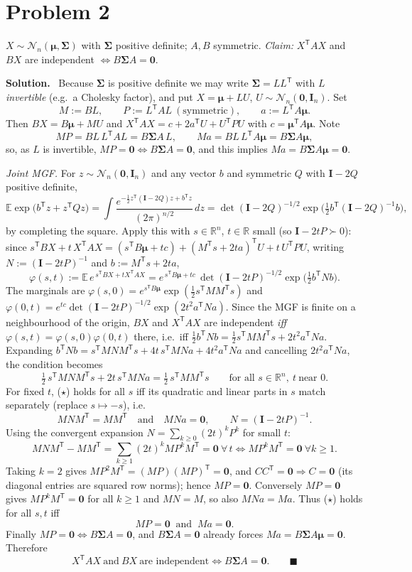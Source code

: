 \documentclass[11pt]{article}
\newcommand{\E}{\mathbb{E}}
\newcommand{\R}{\mathbb{R}}
\newcommand{\N}{\mathcal{N}}
\newcommand{\bI}{\mathbf{I}}
\newcommand{\bmu}{\bm{\mu}}
\newcommand{\bSig}{\bm{\Sigma}}
\newcommand{\T}{^{\mathsf{T}}}
\newcommand{\inv}{^{-1}}
\theoremstyle{remark}
\newcommand{\ans}{\medskip\noindent\textbf{Solution.}\ }
\begin{document}
\section*{Problem 2}

$X\sim\N_n(\bmu,\bSig)$ with $\bSig$ positive definite; $A,B$ symmetric. \emph{Claim:} $X\T AX$ and $BX$
are independent $\iff B\bSig A=\mathbf 0$.

\ans
Because $\bSig$ is positive definite we may write $\bSig=LL\T$ with $L$ \emph{invertible} (e.g.\ a Cholesky
factor), and put $X=\bmu+LU$, $U\sim\N_n(\mathbf 0,\bI_n)$. Set
\[
M:=BL,\qquad P:=L\T AL\ (\text{symmetric}),\qquad a:=L\T A\bmu .
\]
Then $BX=B\bmu+MU$ and $X\T AX=c+2a\T U+U\T PU$ with $c=\bmu\T A\bmu$. Note
\[
MP=BL\,L\T AL=B\bSig A\,L,\qquad Ma=BL\,L\T A\bmu=B\bSig A\bmu,
\]
so, as $L$ is invertible, $MP=\mathbf 0\iff B\bSig A=\mathbf 0$, and this implies $Ma=B\bSig A\bmu=\mathbf 0$.

\medskip
\emph{Joint MGF.} For $z\sim\N_n(\mathbf 0,\bI_n)$ and any vector $b$ and symmetric $Q$ with $\bI-2Q$
positive definite,
\[
\E\exp\!\big(b\T z+z\T Qz\big)
=\int\frac{e^{-\frac12 z\T(\bI-2Q)z+b\T z}}{(2\pi)^{n/2}}\,dz
=\det(\bI-2Q)^{-1/2}\exp\!\Big(\tfrac12 b\T(\bI-2Q)\inv b\Big),
\]
by completing the square. Apply this with $s\in\R^n$, $t\in\R$ small (so $\bI-2tP\succ0$): since
$s\T BX+t\,X\T AX=(s\T B\bmu+tc)+(M\T s+2ta)\T U+t\,U\T PU$, writing $N:=(\bI-2tP)\inv$ and $b:=M\T s+2ta$,
\[
\varphi(s,t):=\E\,e^{\,s\T BX+t X\T AX}
=e^{\,s\T B\bmu+tc}\,\det(\bI-2tP)^{-1/2}\exp\!\big(\tfrac12 b\T N b\big).
\]
The marginals are $\varphi(s,0)=e^{s\T B\bmu}\exp(\tfrac12 s\T MM\T s)$ and
$\varphi(0,t)=e^{tc}\det(\bI-2tP)^{-1/2}\exp(2t^2 a\T N a)$. Since the MGF is finite on a neighbourhood of the
origin, $BX$ and $X\T AX$ are independent \emph{iff} $\varphi(s,t)=\varphi(s,0)\varphi(0,t)$ there, i.e.\ iff
$\tfrac12 b\T Nb=\tfrac12 s\T MM\T s+2t^2a\T Na$. Expanding $b\T Nb=s\T MNM\T s+4t\,s\T MNa+4t^2 a\T Na$ and
cancelling $2t^2a\T Na$, the condition becomes
\begin{equation*}
\tfrac12\,s\T MNM\T s+2t\,s\T MNa=\tfrac12\,s\T MM\T s\qquad\text{for all }s\in\R^n,\ t\ \text{near }0.
\tag{$\star$}
\end{equation*}
For fixed $t$, ($\star$) holds for all $s$ iff its quadratic and linear parts in $s$ match separately
(replace $s\mapsto-s$), i.e.
\[
M N M\T=MM\T\quad\text{and}\quad MNa=\mathbf 0,\qquad N=(\bI-2tP)\inv .
\]
Using the convergent expansion $N=\sum_{k\ge0}(2t)^kP^k$ for small $t$:
\[
MNM\T-MM\T=\sum_{k\ge1}(2t)^k MP^kM\T=\mathbf 0\ \forall\,t
\iff MP^kM\T=\mathbf0\ \forall k\ge1 .
\]
Taking $k=2$ gives $MP^2M\T=(MP)(MP)\T=\mathbf 0$, and $CC\T=\mathbf 0\Rightarrow C=\mathbf 0$ (its diagonal
entries are squared row norms); hence $MP=\mathbf 0$. Conversely $MP=\mathbf 0$ gives $MP^kM\T=\mathbf0$ for
all $k\ge1$ and $MN=M$, so also $MNa=Ma$. Thus ($\star$) holds for all $s,t$ iff
\[
MP=\mathbf 0\ \text{ and }\ Ma=\mathbf 0.
\]
Finally $MP=\mathbf0\iff B\bSig A=\mathbf0$, and $B\bSig A=\mathbf0$ already forces $Ma=B\bSig A\bmu=\mathbf0$.
Therefore
\[
X\T AX\ \text{and}\ BX\ \text{are independent}\iff B\bSig A=\mathbf 0. \qquad\blacksquare
\]
\end{document}
